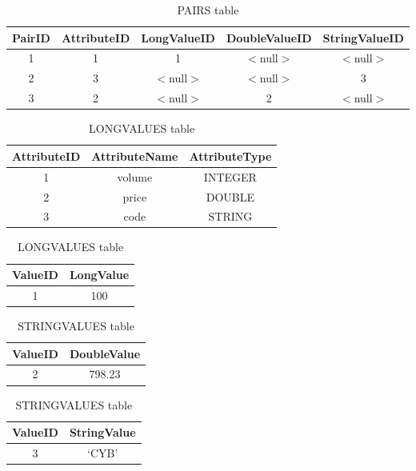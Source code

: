 \documentclass[11pt]{article}
\begin{document}
\begin{table}[!h]					%
\centering
\begin{tabular}{c|c|c|c|c}
\textbf{PairID} & AttributeID & LongValueID & DoubleValueID & StringValueID\\
\hline
1 & 1 & 1 & $<$null$>$ & $<$null$>$\\
2 & 3 & $<$null$>$ & $<$null$>$ & 3\\
3 & 2 & $<$null$>$ & 2 & $<$null$>$\\
\end{tabular}
\caption{PAIRS table}
\end{table}

\begin{table}[!h]						%
\begin{minipage}[!h]{0.5\linewidth}
\centering
\begin{tabular}{c|c|c}
\textbf{AttributeID} & AttributeName & AttributeType \\
\hline
1 & volume & INTEGER \\
2 & price & DOUBLE \\
3 & code & STRING \\
\end{tabular}
\caption{ATTRIBUTES table}
\end{minipage}
\begin{minipage}[!h]{0.5\linewidth}
\centering
\begin{tabular}{c|c}
\textbf{ValueID} & LongValue \\
\hline
1 & 100 \\
\end{tabular}
\caption{LONGVALUES table}
\end{minipage}
\end{table}

\begin{table}[!h]							%
\begin{minipage}[!h]{0.5\linewidth}
\centering
\begin{tabular}{c|c}
\textbf{ValueID} & DoubleValue \\
\hline
2 & 798.23 \\
\end{tabular}
\caption{DOUBLEVALUES table}
\end{minipage}
\begin{minipage}[!h]{0.5\linewidth}
\centering
\begin{tabular}{c|c}
\textbf{ValueID} & StringValue \\
\hline
3 & `CYB'
\end{tabular}
\caption{STRINGVALUES table}
\end{minipage}
\end{table}
\end{document}
